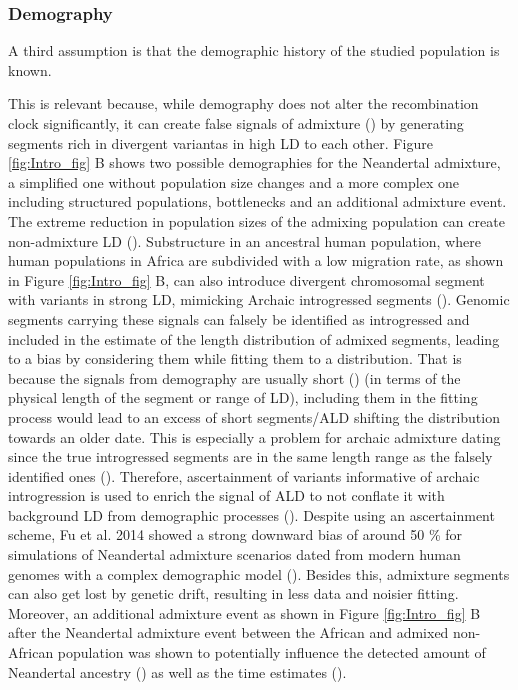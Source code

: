 \documentclass[]{article}
\begin{document}
\subsubsection{Demography}\label{demography}

A third assumption is that the demographic history of the studied
population is known.

This is relevant because, while demography does not alter the
recombination clock significantly, it can create false signals of
admixture (\cite{vernot_resurrecting_2014,hsieh_whole-genome_2016}) by
generating segments rich in divergent variantas in high LD to each
other. Figure \ref{fig:Intro_fig} B shows two possible demographies for
the Neandertal admixture, a simplified one without population size
changes and a more complex one including structured populations,
bottlenecks and an additional admixture event. The extreme reduction in
population sizes of the admixing population can create non-admixture LD
(\cite{schaper_linkage_2012}). Substructure in an ancestral human
population, where human populations in Africa are subdivided with a low
migration rate, as shown in Figure \ref{fig:Intro_fig} B, can also
introduce divergent chromosomal segment with variants in strong LD,
mimicking Archaic introgressed segments
(\cite{nei_linkage_1973,pfaff_population_2001}). Genomic segments
carrying these signals can falsely be identified as introgressed and
included in the estimate of the length distribution of admixed segments,
leading to a bias by considering them while fitting them to a
distribution. That is because the signals from demography are usually
short (\cite{patterson_methods_2004,moorjani_history_2011}) (in terms of
the physical length of the segment or range of LD), including them in
the fitting process would lead to an excess of short segments/ALD
shifting the distribution towards an older date. This is especially a
problem for archaic admixture dating since the true introgressed
segments are in the same length range as the falsely identified ones
(\cite{sankararaman_date_2012}). Therefore, ascertainment of variants
informative of archaic introgression is used to enrich the signal of ALD
to not conflate it with background LD from demographic processes
(\cite{sankararaman_date_2012,fu_genome_2014,sankararaman_combined_2016,moorjani_genetic_2016}).
Despite using an ascertainment scheme, Fu et al. 2014 showed a strong
downward bias of around 50 \% for simulations of Neandertal admixture
scenarios dated from modern human genomes with a complex demographic
model (\cite{fu_genome_2014}). Besides this, admixture segments can also
get lost by genetic drift, resulting in less data and noisier fitting.
Moreover, an additional admixture event as shown in Figure
\ref{fig:Intro_fig} B after the Neandertal admixture event between the
African and admixed non-African population was shown to potentially
influence the detected amount of Neandertal ancestry
(\cite{petr_limits_2019}) as well as the time estimates
(\cite{sankararaman_date_2012}).
\end{document}
